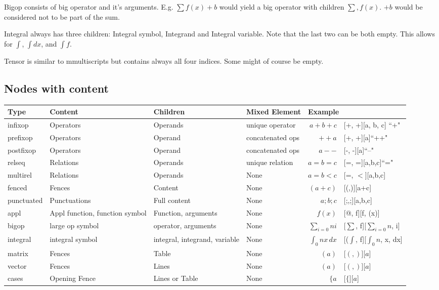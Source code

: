 \documentclass{article}
\begin{document}
Bigop consists of big operator and it's arguments. E.g. $\sum f(x) + b$ would
yield a big operator with children $\sum, f(x)$. $+ b$ would be considered not
to be part of the sum.

Integral always has three children: Integral symbol, Integrand and Integral
variable. Note that the last two can be both empty. This allows for $\int$,
$\int dx$, and $\int f$.

Tensor is similar to mmultiscripts but contains always all four indices.  Some
might of course be empty.

\subsection{Nodes with content}


\noindent
\begin{tabular}{l||p{3.5cm}|p{3.5cm}|l||r@{$\quad\longrightarrow\quad$}l}
  Type & Content & Children & Mixed Element & \multicolumn{2}{l}{Example}\\\hline
  infixop & Operators & Operands & unique operator & $a+b+c$ &  [+, +][a, b, c] ``+" \\
  prefixop & Operators & Operand & concatenated ops & $++a$ & [+, +][a]``++" \\ 
  postfixop & Operators & Operand & concatenated ops & $a--$ & [-, -][a]``--" \\ 
  relseq & Relations & Operands & unique relation & $a=b=c$ & [=, =][a,b,c]``=" \\ 
  multirel & Relations & Operands & None & $a=b<c$ & [=, $<$][a,b,c] \\ 
  fenced & Fences & Content & None & $(a + c)$ & [(,)][a+c]\\
  punctuated & Punctuations & Full content & None & $a;b;c$ & [;,;][a,b,c]\\
  appl & Appl function, function symbol & Function, arguments & None & $f(x)$ & [@, f][f, (x)]\\ 
  bigop & large op symbol & operator, arguments & None & $\sum_{i=0}{n} i$ & [$\sum$, f][$\sum_{i=0}{n}$, i]\\ 
  integral & integral symbol & integral, integrand, variable & None & $\int_{0}{n}x\, dx$ & [($\int$, f][$\int_{0}{n}$, x, dx]\\
  matrix & Fences & Table & None & $(a)$ & [$(,)$][$a$]\\
  vector & Fences & Lines & None & $(a)$ & [$(,)$][$a$]\\
  cases & Opening Fence & Lines or Table & None & $\{a$ & [$\{$][$a$]\\
\end{tabular}
\end{document}

